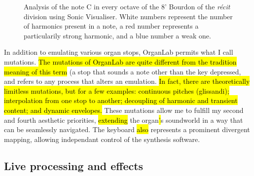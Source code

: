 \documentclass[12pt,twoside,maitrise]{dms_ks}
\theoremstyle{definition}
\begin{document}
{{\begin{figure}[h]
    \centering
	\caption{Analysis of the note C in every octave of the 8' Bourdon of the \textit{récit} division using Sonic Visualiser. White numbers represent the number of harmonics present in a note, a red number represents a particularily strong harmonic, and a blue number a weak one.}
    \label{fig:bourdon_analysis}
\end{figure}


In addition to emulating various organ stops, OrganLab permits what I call mutations. 
\hl{The mutations of OrganLab are quite different from the tradition meaning of this term} (a stop that sounds a note other than the key depressed, and refers to any process that alters an emulation.  
\hl{In fact, there are theoretically limitless mutations, but for a few examples: continuous pitches (glissandi); interpolation from one stop to another; decoupling of harmonic and transient content; and dynamic envelopes.} 
These mutations allow me to fulfill my second and fourth aesthetic priorities, \hl{extending} the organ\hl{'}s soundworld in a way that can be seamlessly navigated. 
The keyboard \hl{also} represents a prominent divergent mapping, allowing independant control of the synthesis software.  


\subsection{Live processing and effects}

}}
\end{document}
